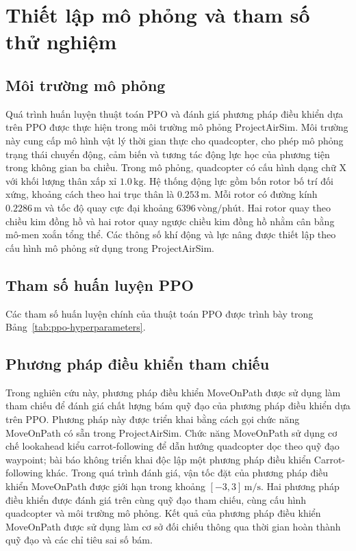 \section{Thiết lập mô phỏng và tham số thử nghiệm}
\label{sec:experimental-setup}

\subsection{Môi trường mô phỏng}

Quá trình huấn luyện thuật toán PPO và đánh giá phương pháp điều khiển dựa trên PPO được thực hiện trong môi trường mô phỏng ProjectAirSim. Môi trường này cung cấp mô hình vật lý thời gian thực cho quadcopter, cho phép mô phỏng trạng thái chuyển động, cảm biến và tương tác động lực học của phương tiện trong không gian ba chiều.
Trong mô phỏng, quadcopter có cấu hình dạng chữ X với khối lượng thân xấp xỉ \(1.0\,\text{kg}\). Hệ thống động lực gồm bốn rotor bố trí đối xứng, khoảng cách theo hai trục thân là \(0.253\,\text{m}\). Mỗi rotor có đường kính \(0.2286\,\text{m}\) và tốc độ quay cực đại khoảng \(6396\,\text{vòng/phút}\). Hai rotor quay theo 
chiều kim đồng hồ và hai rotor quay ngược chiều kim đồng hồ nhằm cân bằng mô-men xoắn tổng thể. Các thông số khí động và lực nâng được thiết lập theo cấu hình mô phỏng sử dụng trong ProjectAirSim.

\subsection{Tham số huấn luyện PPO}

Các tham số huấn luyện chính của thuật toán PPO được trình bày trong Bảng~\ref{tab:ppo-hyperparameters}.


\subsection{Phương pháp điều khiển tham chiếu}
Trong nghiên cứu này, phương pháp điều khiển MoveOnPath được sử dụng làm tham chiếu để đánh giá chất lượng bám quỹ đạo của phương pháp điều khiển dựa trên PPO. Phương pháp này được triển khai bằng cách gọi chức năng MoveOnPath có sẵn trong ProjectAirSim. Chức năng MoveOnPath sử dụng cơ chế lookahead kiểu carrot-following để dẫn hướng quadcopter dọc theo quỹ đạo waypoint\cite{b21}; bài báo không triển khai độc lập một phương pháp điều khiển Carrot-following khác. Trong quá trình đánh giá, vận tốc đặt của phương pháp điều khiển MoveOnPath được giới hạn trong khoảng \([-3,3]\,\text{m/s}\). Hai phương pháp điều khiển được đánh giá trên cùng quỹ đạo tham chiếu, cùng cấu hình quadcopter và môi trường mô phỏng. Kết quả của phương pháp điều khiển MoveOnPath được sử dụng làm cơ sở đối chiếu thông qua thời gian hoàn thành quỹ đạo và các chỉ tiêu sai số bám.
